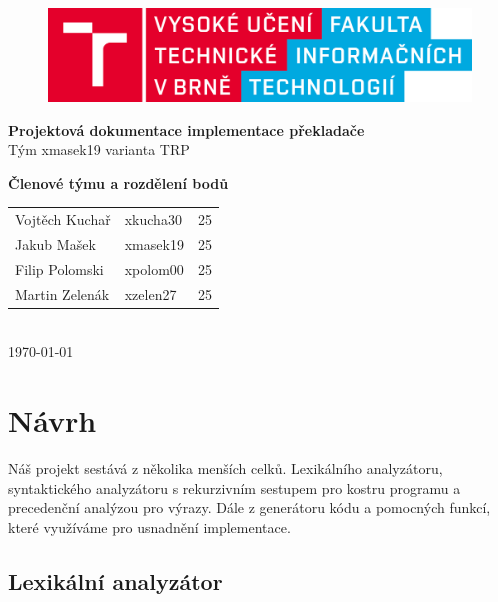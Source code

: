 \documentclass{article}
\begin{document}
\thispagestyle{empty}
	
	\begin{figure}[ht]
		\includegraphics[height = 3 cm]{images/fit_logo.png}
		\label{FIT}
		\endminipage
	\end{figure}
	
	\begin{center}
	\vspace{1.cm}
	\LARGE
	\textbf{Projektová dokumentace implementace překladače}\\
	Tým xmasek19 varianta TRP\\
	\vspace{.3cm}
	\large
	
	\vspace{7.cm}
	\textbf{Členové týmu a rozdělení bodů}\\
            \begin{tabular}{l l l}
            Vojtěch Kuchař & xkucha30 & 25\\
            Jakub Mašek & xmasek19 & 25\\
            Filip Polomski & xpolom00 & 25\\
            Martin Zelenák & xzelen27 & 25\\
            \end{tabular}\\
	\vspace{1.3cm}
	\today
	\end{center}
	\newpage
	
\tableofcontents
\newpage

\section{Návrh}

Náš projekt sestává z několika menších celků. Lexikálního analyzátoru, syntaktického analyzátoru s rekurzivním sestupem pro kostru programu a precedenční analýzou pro výrazy. Dále z generátoru kódu a pomocných funkcí, které využíváme pro usnadnění implementace.

\subsection{Lexikální analyzátor}
\end{document}
